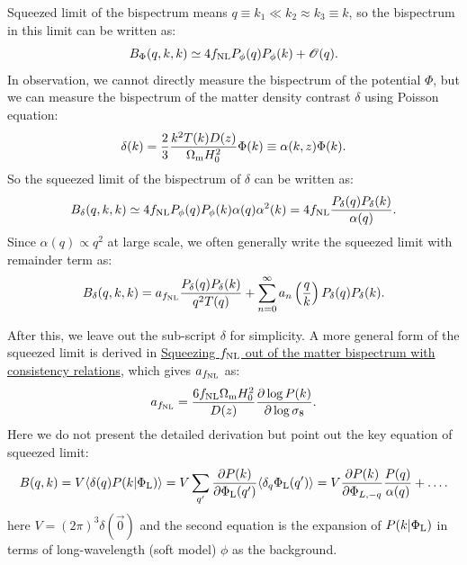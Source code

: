 Squeezed limit of the bispectrum means $q \equiv k_1 \ll k_2\approx k_3 \equiv k$, so the bispectrum in this limit can be written as:
\begin{equation}
    B_\Phi(q,k,k) \simeq 4f_{\rm NL} P_\phi(q)P_\phi(k) + \mathscr{O}(q).
\end{equation}
In observation, we cannot directly measure the bispectrum of the potential $\Phi$, but we can measure the bispectrum of the matter density contrast $\delta$ using Poisson equation:
\begin{equation}
    \delta(k) = \dfrac{2}{3}\dfrac{k^2 T(k)D(z)}{\Omega_{\rm m}H_0^2}\Phi(k) \equiv \alpha(k,z)\Phi(k).
\end{equation}
So the squeezed limit of the bispectrum of $\delta$ can be written as:
\begin{equation}
    B_\delta(q,k,k) \simeq 4f_{\rm NL} P_\phi(q)P_\phi(k)\alpha(q)\alpha^2(k) = 4f_{\rm NL} \dfrac{P_\delta(q)P_\delta(k)}{\alpha(q)}.
\end{equation}
Since $\alpha(q)\propto q^2$ at large scale, we often generally write the squeezed limit with remainder term as:
\begin{equation}
    B_\delta(q,k,k) = a_{f_{\rm NL}} \dfrac{P_\delta(q)P_\delta(k)}{q^2T(q)} + \sum_{n=0}^\infty a_{n}\left(\dfrac{q}{k}\right)P_\delta(q)P_\delta(k).
\end{equation}

After this, we leave out the sub-script $\delta$ for simplicity. A more general form of the squeezed limit is derived in \href{https://arxiv.org/pdf/2209.06228}{Squeezing $f_{\rm NL}$ out of the matter bispectrum with consistency relations}, which gives $a_{f_{\rm NL}}$ as:
\begin{equation}
    a_{f_{\rm NL}}  = \dfrac{6f_{\rm NL} \Omega_{\rm m}H_0^2}{D(z)}\dfrac{\partial \log P(k)}{\partial \log \sigma_8}.
\end{equation}
Here we do not present the detailed derivation but point out the key equation of squeezed limit:
\begin{equation}
    B(q,k) = V\langle \delta(q)P(k|\Phi_{\rm L})\rangle =  V \sum_{q'} \frac{\partial P(k)}{\partial \Phi_{\rm L}(q')} \langle \delta_q \Phi_{\rm L}(q') \rangle = V \frac{\partial P(k)}{\partial \Phi_{L, -q}} \frac{P(q)}{\alpha(q)} + \dots.
\end{equation}
here $V = (2\pi)^3 \delta(\vec{0})$ and the second equation is the expansion of $P(k|\Phi_{\rm L})$ in terms of long-wavelength (soft model) $\phi$ as the background.

